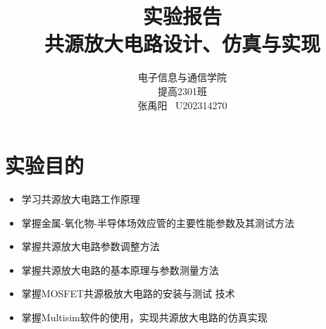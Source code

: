 \documentclass[a4paper,11pt,UTF8]{article}
\numberwithin{equation}{subsection}
\begin{document}
\title{\huge 实验报告 \\ 共源放大电路设计、仿真与实现}
\author{电子信息与通信学院 \\ 提高2301班 \\ 张禹阳 \ U202314270}

\maketitle

\begin{figure}[H]
	\centering
\end{figure}

\tableofcontents\newpage

\section{实验目的}
\begin{itemize}
	\item 学习共源放大电路工作原理
	\item 掌握金属-氧化物-半导体场效应管的主要性能参数及其测试方法
	\item 掌握共源放大电路参数调整方法
	\item 掌握共源放大电路的基本原理与参数测量方法
	\item 掌握MOSFET共源极放大电路的安装与测试 技术
	\item 掌握Multisim软件的使用，实现共源放大电路的仿真实现
\end{itemize}
\end{document}
